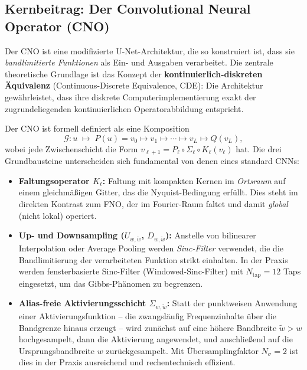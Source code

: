 \documentclass[a4paper,12pt]{article}
\begin{document}
\subsection*{Kernbeitrag: Der Convolutional Neural Operator (CNO)}

Der CNO ist eine modifizierte U-Net-Architektur, die so konstruiert ist, dass
sie \emph{bandlimitierte Funktionen} als Ein- und Ausgaben verarbeitet. Die
zentrale theoretische Grundlage ist das Konzept der
\textbf{kontinuierlich-diskreten \"Aquivalenz} (Continuous-Discrete Equivalence,
CDE): Die Architektur gew\"ahrleistet, dass ihre diskrete Computerimplementierung
exakt der zugrundeliegenden kontinuierlichen Operatorabbildung entspricht.

Der CNO ist formell definiert als eine Komposition
\[
  \mathcal{G}\colon u \;\mapsto\; P(u) = v_0 \mapsto v_1 \mapsto \cdots
  \mapsto v_L \mapsto Q(v_L),
\]
wobei jede Zwischenschicht die Form $v_{\ell+1} = P_\ell \circ \Sigma_\ell \circ
K_\ell(v_\ell)$ hat. Die drei Grundbausteine unterscheiden sich fundamental von
denen eines standard CNNs:

\begin{itemize}
  \item \textbf{Faltungsoperator $K_\ell$:} Faltung mit kompakten Kernen im
    \emph{Ortsraum} auf einem gleichm\"a\ss igen Gitter, das die
    Nyquist-Bedingung erf\"ullt. Dies steht im direkten Kontrast zum FNO, der
    im Fourier-Raum faltet und damit \emph{global} (nicht lokal) operiert.

  \item \textbf{Up- und Downsampling ($U_{w,\tilde{w}}$, $D_{w,\tilde{w}}$):}
    Anstelle von bilinearer Interpolation oder Average Pooling werden
    \emph{Sinc-Filter} verwendet, die die Bandlimitierung der verarbeiteten
    Funktion strikt einhalten. In der Praxis werden fensterbasierte Sinc-Filter
    (Windowed-Sinc-Filter) mit $N_\text{tap} = 12$ Taps eingesetzt, um das
    Gibbs-Ph\"anomen zu begrenzen.

  \item \textbf{Alias-freie Aktivierungsschicht $\Sigma_{w,\tilde{w}}$:}
    Statt der punktweisen Anwendung einer Aktivierungsfunktion -- die zwangsl\"aufig
    Frequenzinhalte \"uber die Bandgrenze hinaus erzeugt -- wird zun\"achst auf eine
    h\"ohere Bandbreite $\tilde{w} > w$ hochgesampelt, dann die Aktivierung
    angewendet, und anschlie\ss end auf die Ursprungsbandbreite $w$
    zur\"uckgesampelt. Mit \"Ubersamplingfaktor $N_\sigma = 2$ ist dies in der
    Praxis ausreichend und rechentechnisch effizient.
\end{itemize}
\end{document}
